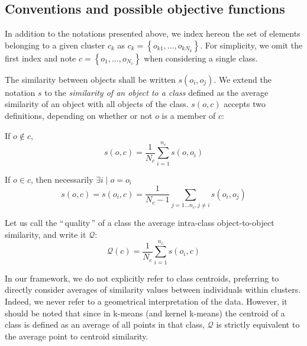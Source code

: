 \documentclass[10pt,journal,compsoc]{IEEEtran}
\newcommand{\gl}[1]{``\,#1\,''} %
\begin{document}
\subsection{Conventions and possible objective functions}

In addition to the notations presented above, we index hereon the set of elements belonging to a given cluster $c_k$ as $c_k = \left\{o_{k1}, \ldots, o_{kN_k}\right\}$. 
For simplicity, we omit the first index and note $c = \left\{o_1, \ldots, o_{N_c}\right\}$ when considering a single class. 

The similarity between objects shall be written $s\left(o_i, o_j\right)$.
We extend the notation $s$ to the \emph{similarity of an object to a
  class} defined as the average similarity of an object
with all objects of the class. $s(o,c)$ accepts two definitions,
depending on whether or not $o$ is a member of $c$:

If $o \notin c$,
\begin{equation}
  s\left(o,c\right) = \frac{1}{N_c} \sum_{i=1}^{n_c}s\left(o, o_i\right)
   \label{eq:soc_notinclass}
\end{equation}

If $o \in c$, then necessarily $\exists i \mid o = o_i$
\begin{equation}
  s\left(o,c\right) = s\left(o_i, c\right) = \frac{1}{N_c-1} \sum_{j=1 \ldots n_c, j \neq i} s\left(o_i, o_j\right)
  	 \label{eq:soc_inclass}
\end{equation}

Let us call the \gl{quality} of a class the average intra-class object-to-object similarity, and write it $\mathcal{Q}$:
\begin{equation}
\mathcal{Q}\left(c\right) = \frac{1}{N_c} \sum_{i=1}^{n_c} s\left(o_i, c\right)
\end{equation}

In our framework, we do not explicitly refer to class centroids, preferring to directly consider averages of similarity values between individuals within clusters. Indeed, we never refer to a geometrical interpretation of the data. However, it should be noted that since in k-means (and kernel k-means) the centroid of a class is defined as an average of all points in that class, $\mathcal{Q}$ is strictly equivalent to the average point to centroid similarity.
\end{document}

